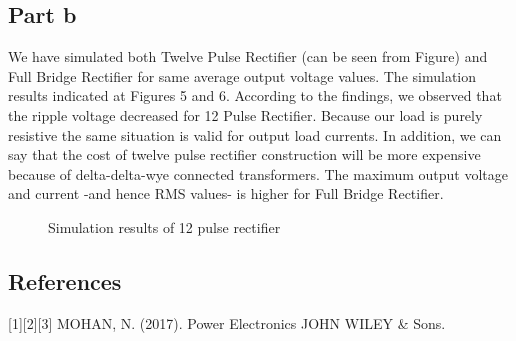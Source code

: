 \documentclass[fleqn, a4paper]{report}
\begin{document}
\subsection*{Part b}
We have simulated both Twelve Pulse Rectifier (can be seen from Figure) and Full Bridge Rectifier for same average output voltage values. The simulation results indicated at Figures 5 and 6. According to the findings, we observed that the ripple voltage decreased for 12 Pulse Rectifier. Because our load is purely resistive the same situation is valid for output load currents. In addition, we can say that the cost of twelve pulse rectifier construction will be more expensive because of delta-delta-wye connected transformers. The maximum output voltage and current -and hence RMS values- is higher for Full Bridge Rectifier.

\begin{figure}[H]%
    \centering
    \qquad
    \caption{Simulation results of 12 pulse rectifier}%
    \label{fig:example}%
\end{figure}



\subsection*{References}
[1][2][3] MOHAN, N. (2017). Power Electronics JOHN WILEY & Sons.
\end{document}
